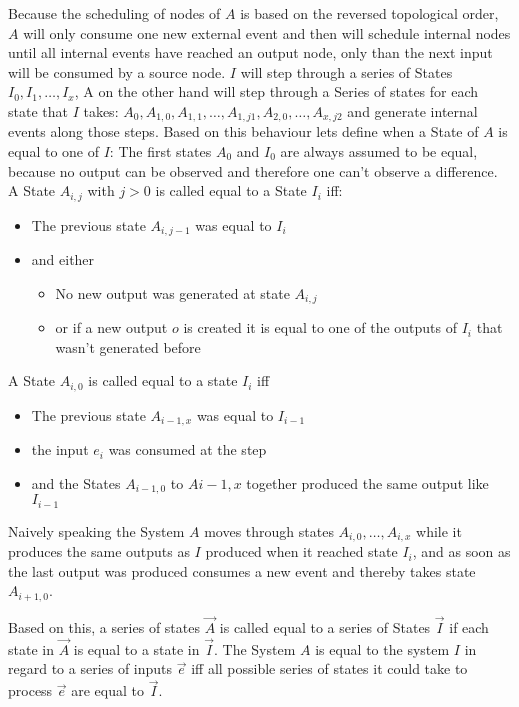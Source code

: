 Because the scheduling of nodes of \(A\) is based on the reversed topological order, \(A\) will only consume one new external event and then will schedule internal nodes until all
internal events have reached an output node, only than the next input will be consumed by a source node.
\(I\) will step through a series of States \(I_0, I_1, \dots, I_x\), A on the other hand will step through a Series of
states for each state that \(I\) takes: \(A_0,A_{1,0},A_{1,1},\dots,A_{1,j1},A_{2,0}, \dots,A_{x,j2}\) and generate internal events along those steps.
Based on this behaviour lets define when a State of \(A\) is equal to one of \(I\):
The first states \(A_0\) and \(I_0\) are always assumed to be equal, because no output can be observed and therefore one
can't observe a difference.
A State \(A_{i,j}\) with \(j > 0\) is called equal to a State \(I_{i}\) iff:
\begin{itemize}
  \item The previous state \(A_{i,j-1}\) was equal to \(I_{i}\)
  \item and either
    \begin{itemize}
      \item No new output was generated at state \(A_{i,j}\)
      \item or if a new output \(o\) is created it is equal to one of the outputs of \(I_{i}\) that wasn't generated before
    \end{itemize}
\end{itemize}

A State \(A_{i,0}\) is called equal to a state \(I_{i}\) iff
\begin{itemize}
  \item The previous state \(A_{i-1,x}\) was equal to \(I_{i-1}\)
  \item the input \(e_i\) was consumed at the step
  \item and the States \(A_{i-1,0}\) to \(A{i-1,x}\) together produced the same output like \(I_{i-1}\)
\end{itemize}

Naively speaking the System \(A\) moves through states \(A_{i,0},\dots,A_{i,x}\) while it produces the same outputs as \(I\)
produced when it reached state \(I_i\), and as soon as the last output was produced consumes a new event and thereby takes
state \(A_{i+1,0}\).

Based on this, a series of states \(\vec{A}\) is called equal to a series of States \(\vec{I}\) if each state in \(\vec{A}\)
is equal to a state in \(\vec{I}\).
The System \(A\) is equal to the system \(I\) in regard to a series of inputs \(\vec{e}\) iff all possible series of
states it could take to process \(\vec{e}\) are equal to \(\vec{I}\).

